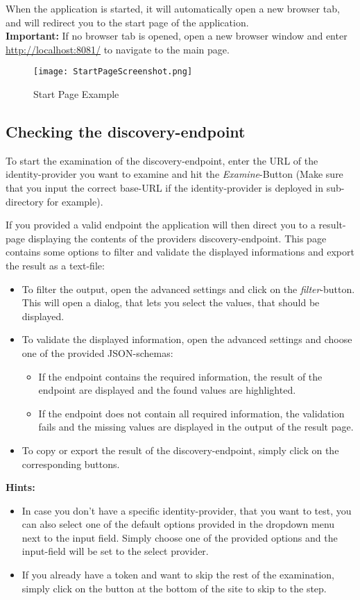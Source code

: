 \documentclass[english, letterpaper, 10 pt]{report}
\begin{document}
\noindent When the application is started, it will automatically open a new browser tab, and will redirect you to the start page of the application.
\\

\noindent \textbf{Important:} If no browser tab is opened, open a new browser window and enter \url{http://localhost:8081/} to navigate to the main page.
\\
\begin{figure}[H]
\texttt{[image: StartPageScreenshot.png]}
\caption{Start Page Example}
\end{figure}
\newpage
\subsection*{Checking the discovery-endpoint}

\noindent To start the examination of the discovery-endpoint, enter the URL of the identity-provider you want to examine and hit the \textit{Examine}-Button (Make sure that you input the correct base-URL if the identity-provider is deployed in sub-directory for example).

\noindent If you provided a valid endpoint the application will then direct you to a result-page displaying the contents of the providers discovery-endpoint. This page contains some options to filter and validate the displayed informations and export the result as a text-file:
\begin{itemize}
\item To filter the output, open the advanced settings and click on the \textit{filter}-button. This will open a dialog, that lets you select the values, that should be displayed.
\item To validate the displayed information, open the advanced settings and choose one of the provided JSON-schemas:
\begin{itemize}
\item If the endpoint contains the required information, the result of the endpoint are displayed and the found values are highlighted.
\item If the endpoint does not contain all required information, the validation fails and the missing values are displayed in the output of the result page.
\end{itemize}
\item To copy or export the result of the discovery-endpoint, simply click on the corresponding buttons.
\end{itemize}
\newpage
\textbf{Hints:}
\begin{itemize}
\item In case you don't have a specific identity-provider, that you want to test, you can also select one of the default options provided in the dropdown menu next to the input field. Simply choose one of the provided options and the input-field will be set to the select provider.
\item If you already have a token and want to skip the rest of the examination, simply click on the button at the bottom of the site to skip to the \textit{ } step.
\end{itemize}
\end{document}
